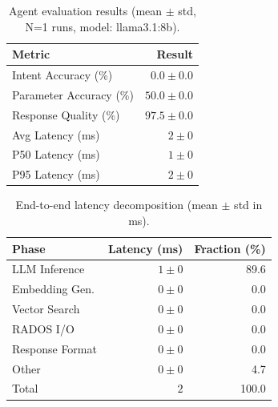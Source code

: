 
\begin{table}[t]
\centering
\caption{Agent evaluation results (mean $\pm$ std, N=1 runs, model: llama3.1:8b).}
\label{tab:eval-results}
\begin{tabular}{lr}
\toprule
\textbf{Metric} & \textbf{Result} \\
\midrule
Intent Accuracy (\%) & $0.0 \pm 0.0$ \\
Parameter Accuracy (\%) & $50.0 \pm 0.0$ \\
Response Quality (\%) & $97.5 \pm 0.0$ \\
\midrule
Avg Latency (ms) & $2 \pm 0$ \\
P50 Latency (ms) & $1 \pm 0$ \\
P95 Latency (ms) & $2 \pm 0$ \\
\bottomrule
\end{tabular}
\end{table}


\begin{table}[t]
\centering
\caption{End-to-end latency decomposition (mean $\pm$ std in ms).}
\label{tab:latency-decomp}
\begin{tabular}{lrr}
\toprule
\textbf{Phase} & \textbf{Latency (ms)} & \textbf{Fraction (\%)} \\
\midrule
LLM Inference & $1 \pm 0$ & 89.6 \\
Embedding Gen. & $0 \pm 0$ & 0.0 \\
Vector Search & $0 \pm 0$ & 0.0 \\
RADOS I/O & $0 \pm 0$ & 0.0 \\
Response Format & $0 \pm 0$ & 0.0 \\
Other & $0 \pm 0$ & 4.7 \\
\midrule
Total & $2$ & 100.0 \\
\bottomrule
\end{tabular}
\end{table}
